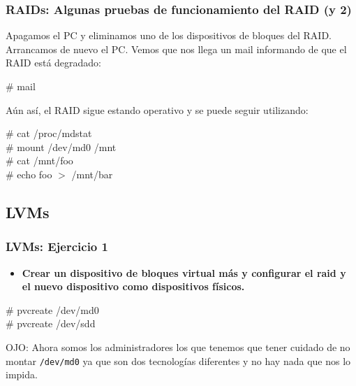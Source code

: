 \documentclass{beamer}
\begin{document}

\begin{frame}
  \frametitle{RAIDs: Algunas pruebas de funcionamiento del RAID (y 2)}

Apagamos el PC y eliminamos uno de los dispositivos de bloques del RAID. Arrancamos de nuevo el PC.
Vemos que nos llega un mail informando de que el RAID está degradado:

  \begin{block}{}
\# mail
  \end{block}

\pause

Aún así, el RAID sigue estando operativo y se puede seguir utilizando:

  \begin{block}{}
\# cat /proc/mdstat \\
\# mount /dev/md0 /mnt \\

\# cat /mnt/foo \\
\# echo foo $>$ /mnt/bar
  \end{block}

\end{frame}


\subsection{LVMs}


\begin{frame}
  \frametitle{LVMs: Ejercicio 1}

\begin{itemize}
\item \textbf{Crear un dispositivo de bloques virtual más y configurar el raid y el nuevo dispositivo como dispositivos físicos.}
\end{itemize}

\pause

  \begin{block}{}
\# pvcreate /dev/md0 \\
\# pvcreate /dev/sdd
  \end{block}

{\footnotesize \alert{OJO:} Ahora somos los administradores los que tenemos que tener cuidado de \alert{no montar \texttt{/dev/md0}} ya que son dos tecnologías diferentes y no hay nada que nos lo impida.}

\end{frame}
\end{document}
